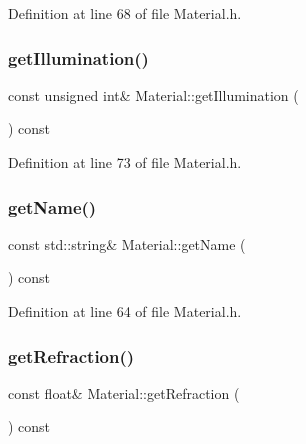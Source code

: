 Definition at line 68 of file Material.\+h.

\mbox{\label{class_material_a30f8ed7054d7f09c42642b28e96a6635}} 
\subsubsection{\texorpdfstring{get\+Illumination()}{getIllumination()}}
{\footnotesize\ttfamily const unsigned int\& Material\+::get\+Illumination (\begin{DoxyParamCaption}{ }\end{DoxyParamCaption}) const\hspace{0.3cm}{\ttfamily [inline]}}



Definition at line 73 of file Material.\+h.

\mbox{\label{class_material_ab51bcfb064df3fa0ec1a5062e873fe49}} 
\subsubsection{\texorpdfstring{get\+Name()}{getName()}}
{\footnotesize\ttfamily const std\+::string\& Material\+::get\+Name (\begin{DoxyParamCaption}{ }\end{DoxyParamCaption}) const\hspace{0.3cm}{\ttfamily [inline]}}



Definition at line 64 of file Material.\+h.

\mbox{\label{class_material_a3c90133f63f8ac1ba05359461234b6a7}} 
\subsubsection{\texorpdfstring{get\+Refraction()}{getRefraction()}}
{\footnotesize\ttfamily const float\& Material\+::get\+Refraction (\begin{DoxyParamCaption}{ }\end{DoxyParamCaption}) const\hspace{0.3cm}{\ttfamily [inline]}}



